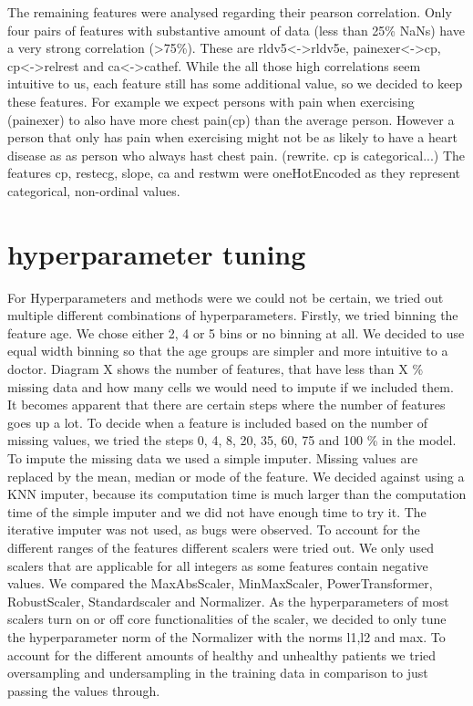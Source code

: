 The remaining features were analysed regarding their pearson correlation. Only four pairs of features with substantive amount of data (less than 25\% NaNs) have a very strong correlation (>75\%).  These are rldv5<->rldv5e, painexer<->cp, cp<->relrest and ca<->cathef. While the all those high correlations seem intuitive to us, each feature still has some additional value, so we decided to keep these features. For example we expect persons with pain when exercising (painexer) to also have more chest pain(cp) than the average person. However a person that only has pain when exercising might not be as likely to have a heart disease as as person who always hast chest pain. (rewrite. cp is categorical...)
The features cp, restecg, slope, ca and restwm were oneHotEncoded as they represent categorical, non-ordinal values. 

\section{hyperparameter tuning }
For Hyperparameters and methods were we could not be certain, we tried out multiple different combinations of hyperparameters.
Firstly, we tried binning the feature age. We chose either 2, 4 or 5 bins or no binning at all. We decided to use equal width binning so that the age groups are simpler and more intuitive to a doctor.
Diagram X shows the number of features, that have less than X \% missing data and how many cells we would need to impute if we included them. It becomes apparent that there are certain steps where the number of features goes up a lot. To decide when a feature is included based on the number of missing values, we tried the steps 0, 4, 8, 20, 35, 60, 75 and 100 \% in the model.
To impute the missing data we used a simple imputer. Missing values are replaced by the mean, median or mode of the feature. We decided against using a KNN imputer, because its computation time is much larger than the computation time of the simple imputer and we did not have enough time to try it. The iterative imputer was not used, as bugs were observed.
To account for the different ranges of the features different scalers were tried out. We only used scalers that are applicable for all integers as some features contain negative values. 
We compared the MaxAbsScaler, MinMaxScaler, PowerTransformer, RobustScaler, Standardscaler and Normalizer. As the hyperparameters of most scalers turn on or off core functionalities of the scaler, we decided to only tune the hyperparameter norm of the Normalizer with the norms l1,l2 and max.
To account for the different amounts of healthy and unhealthy patients we tried oversampling and undersampling in the training data in comparison to just passing the values through.





